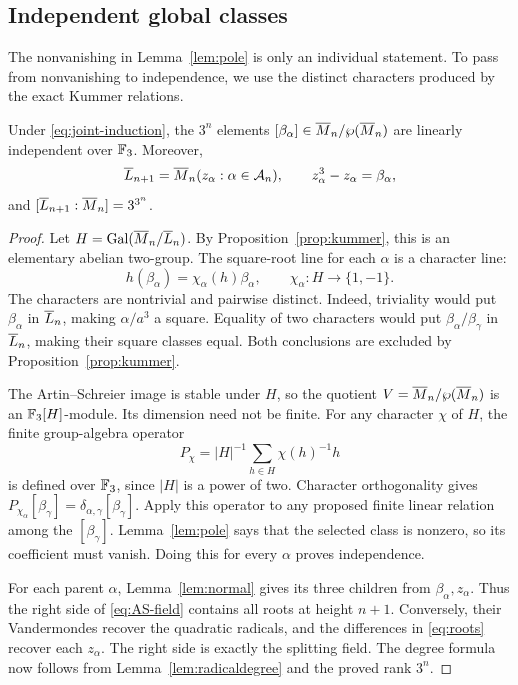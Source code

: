 \subsection{Independent global classes}

The nonvanishing in Lemma~\ref{lem:pole} is only an individual
statement. To pass from nonvanishing to independence, we use the
distinct characters produced by the exact Kummer relations.

\begin{proposition}\label{prop:AS-global}
Under \eqref{eq:joint-induction}, the $3^n$ elements
$[\beta_\alpha]\in\overline{M}_n/\wp(\overline{M}_n)$ are linearly
independent over $\mathbb{F}_3$. Moreover,
\begin{equation}\label{eq:AS-field}
 \overline{L}_{n+1}
   =\overline{M}_n(z_\alpha:\alpha\in\mathcal A_n),
 \qquad z_\alpha^3-z_\alpha=\beta_\alpha,
\end{equation}
and $[\overline{L}_{n+1}:\overline{M}_n]=3^{3^n}$.
\end{proposition}

\begin{proof}
Let $H=\operatorname{Gal}(\overline{M}_n/\overline{L}_n)$. By
Proposition~\ref{prop:kummer}, this is an elementary abelian
two-group. The square-root line for each $\alpha$ is a character
line:
\[
 h(\beta_\alpha)=\chi_\alpha(h)\beta_\alpha,
 \qquad \chi_\alpha:H\longrightarrow\{1,-1\}.
\]
The characters are nontrivial and pairwise distinct. Indeed,
triviality would put $\beta_\alpha$ in $\overline{L}_n$, making
$\alpha/a^3$ a square. Equality of two characters would put
$\beta_\alpha/\beta_\gamma$ in $\overline{L}_n$, making their square
classes equal. Both conclusions are excluded by
Proposition~\ref{prop:kummer}.

The Artin--Schreier image is stable under $H$, so the quotient
$V=\overline{M}_n/\wp(\overline{M}_n)$ is an $\mathbb{F}_3[H]$-module.
Its dimension need not be finite. For any character $\chi$ of
$H$, the finite group-algebra operator
\[
 P_\chi=|H|^{-1}\sum_{h\in H}\chi(h)^{-1}h
\]
is defined over $\mathbb{F}_3$, since $|H|$ is a power of two.
Character orthogonality gives
$P_{\chi_\alpha}[\beta_\gamma]
 =\delta_{\alpha,\gamma}[\beta_\gamma]$.
Apply this operator to any proposed finite linear relation among
the $[\beta_\gamma]$. Lemma~\ref{lem:pole} says that the
selected class is nonzero, so its coefficient must vanish.
Doing this for every $\alpha$ proves independence.

For each parent $\alpha$, Lemma~\ref{lem:normal} gives its
three children from $\beta_\alpha,z_\alpha$. Thus the right
side of \eqref{eq:AS-field} contains all roots at height $n+1$.
Conversely, their Vandermondes recover the quadratic radicals,
and the differences in \eqref{eq:roots} recover each
$z_\alpha$. The right side is exactly the splitting field.
The degree formula now follows from
Lemma~\ref{lem:radicaldegree} and the proved rank $3^n$.
\end{proof}

